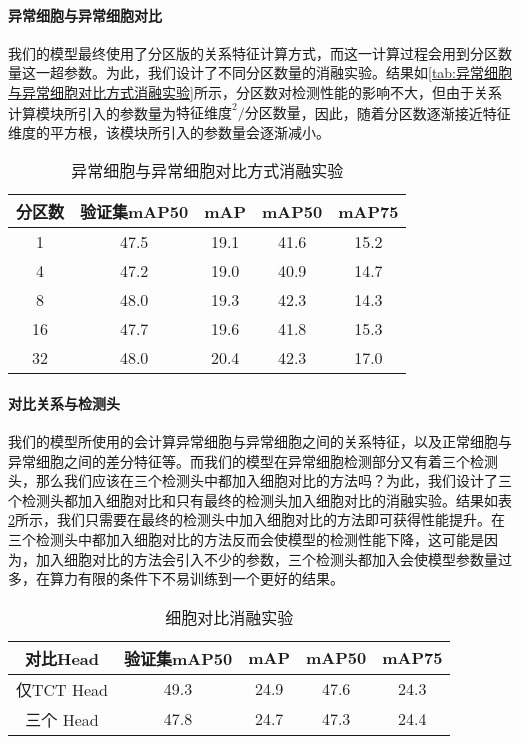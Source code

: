 \paragraph{异常细胞与异常细胞对比}
\par 我们的模型最终使用了分区版的关系特征计算方式，而这一计算过程会用到分区数量这一超参数。为此，我们设计了不同分区数量的消融实验。结果如\autoref{tab:异常细胞与异常细胞对比方式消融实验}所示，分区数对检测性能的影响不大，但由于关系计算模块所引入的参数量为$\text{特征维度}^2/\text{分区数量}$，因此，随着分区数逐渐接近特征维度的平方根，该模块所引入的参数量会逐渐减小。
\begin{table}[htbp]
    \centering
    \caption{异常细胞与异常细胞对比方式消融实验}
    \begin{tabular}{|c|c|c|c|c|}
        \hline
        分区数 & 验证集mAP50 & mAP  & mAP50 & mAP75 \\ \hline
        1      & 47.5        & 19.1 & 41.6  & 15.2  \\ \hline
        4      & 47.2        & 19.0 & 40.9  & 14.7  \\ \hline
        8      & 48.0        & 19.3 & 42.3  & 14.3  \\ \hline
        16     & 47.7        & 19.6 & 41.8  & 15.3  \\ \hline
        32     & 48.0        & 20.4 & 42.3  & 17.0  \\ \hline
    \end{tabular}
    \label{tab:异常细胞与异常细胞对比方式消融实验}
\end{table}

\paragraph{对比关系与检测头}
\par 我们的模型所使用的会计算异常细胞与异常细胞之间的关系特征，以及正常细胞与异常细胞之间的差分特征等。而我们的模型在异常细胞检测部分又有着三个检测头，那么我们应该在三个检测头中都加入细胞对比的方法吗？为此，我们设计了三个检测头都加入细胞对比和只有最终的检测头加入细胞对比的消融实验。结果如表\ref{tab:细胞对比消融实验}所示，我们只需要在最终的检测头中加入细胞对比的方法即可获得性能提升。在三个检测头中都加入细胞对比的方法反而会使模型的检测性能下降，这可能是因为，加入细胞对比的方法会引入不少的参数，三个检测头都加入会使模型参数量过多，在算力有限的条件下不易训练到一个更好的结果。

\begin{table}[htbp]
    \centering
    \caption{细胞对比消融实验}
    \begin{tabular}{|c|c|c|c|c|}
        \hline
        对比Head   & 验证集mAP50 & mAP  & mAP50 & mAP75 \\ \hline
        仅TCT Head & 49.3        & 24.9 & 47.6  & 24.3  \\ \hline
        三个 Head  & 47.8        & 24.7 & 47.3  & 24.4  \\ \hline
    \end{tabular}
    \label{tab:细胞对比消融实验}
\end{table}

